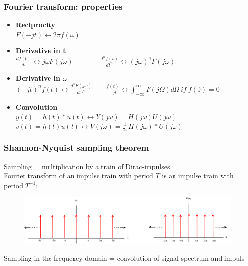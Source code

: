 \begin{frame}
	\frametitle{Fourier transform: properties}
	\begin{itemize}
		\item \textbf{Reciprocity} \\
		\medskip
		$F(-jt) \leftrightarrow  2 \pi f(\omega)$
		\medskip
		\item \textbf{Derivative in t} \\
		\medskip
		$\frac{df(t)}{dt} \leftrightarrow j\omega F(j\omega) \qquad \qquad \frac{d^nf(t)}{dt^n} \leftrightarrow (j\omega)^n F(j\omega)$
		\medskip
		\item \textbf{Derivative in $\omega$} \\
		\medskip
		$(-jt)^n f(t) \leftrightarrow \frac{d^n F(j\omega)}{d\omega^n} \qquad \frac{f(t)}{-jt} \leftrightarrow \int_{-\infty}^\infty F(j\Omega) d\Omega \> if \> f(0) = 0$
		\medskip
		\item \textbf{Convolution} \\
		\medskip
		$y(t) = h(t) * u(t) \leftrightarrow Y(j\omega) = H(j\omega) U(j\omega)$\\
		$v(t) = h(t)u(t) \leftrightarrow V(j\omega) = \frac{1}{2\pi} H(j\omega)*U(j\omega)$
	\end{itemize}
\end{frame}

\begin{frame}
	\frametitle{Shannon-Nyquist sampling theorem}
	Sampling = multiplication by a train of Dirac-impulses\\
	Fourier transform of an impulse train with period $T$ is an impulse train with period $T^{-1}$:
	\begin{figure}
		\includegraphics[width=1\linewidth]{fourier_impulse_train}
	\end{figure}
	Sampling in the frequency domain = convolution of signal spectrum and impuls
\end{frame}

